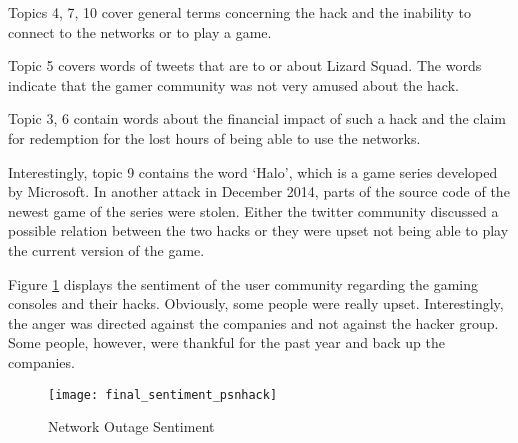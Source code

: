 Topics 4, 7, 10 cover general terms concerning the hack and the inability to connect to the networks or to play a game.

Topic 5 covers words of tweets that are to or about Lizard Squad. The words indicate that the gamer community was not very amused about the hack.

Topic 3, 6 contain words about the financial impact of such a hack and the claim for redemption for the lost hours of being able to use the networks.

Interestingly, topic 9 contains the word ‘Halo’, which is a game series developed by Microsoft. In another attack in December 2014, parts of the source code of the newest game of the series were stolen. Either the twitter community discussed a possible relation between the two hacks or they were upset not being able to play the current version of the game.\cite{griffin2014unreleased}

Figure \ref{fig:network-outage-sentiment} displays the sentiment of the user community regarding the gaming consoles and their hacks. Obviously, some people were really upset. Interestingly, the anger was directed against the companies and not against the hacker group. Some people, however, were thankful for the past year and back up the companies.

\begin{figure}[H]
  \centering
        \texttt{[image: final\_sentiment\_psnhack]}
  \caption[Network Outage Sentiment]{Network Outage Sentiment}
  \label{fig:network-outage-sentiment}
  \vspace{-1.3em}
\end{figure}